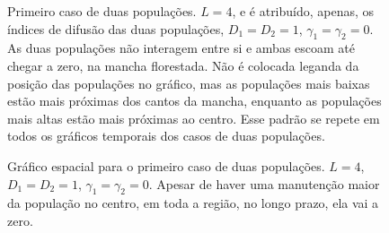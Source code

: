 \documentclass{article}
\begin{document}
\begin{figure}[h]
		\caption{Primeiro caso de duas populações. $L=4$, e é atribuído, apenas, os índices de difusão das duas populações, $D_1 = D_2 = 1$, $\gamma_1 = \gamma_2 = 0$. As duas populações não interagem entre si e ambas escoam até chegar a zero, na mancha florestada. Não é colocada leganda da posição das populações no gráfico, mas as populações mais baixas estão mais próximas dos cantos da mancha, enquanto as populações mais altas estão mais próximas ao centro. Esse padrão se repete em todos os gráficos temporais dos casos de duas populações.}
		\label{fig:Two-P-00-Diffusion-Time}
	\end{figure}	

	\begin{figure}[h]
		\centering
		\qquad
		\caption{Gráfico espacial para o primeiro caso de duas populações. $L=4$, $D_1 = D_2 = 1$, $\gamma_1 = \gamma_2 = 0$. Apesar de haver uma manutenção maior da população no centro, em toda a região, no longo prazo, ela vai a zero.}
		\label{fig:Two-P-02-Diffusion-Space}
	\end{figure}	
	
\end{document}
